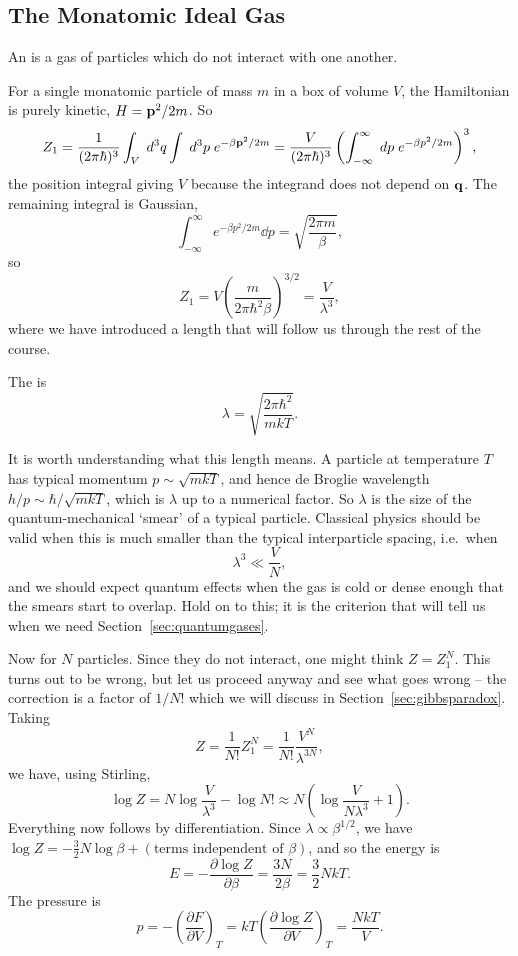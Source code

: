 \documentclass[a4paper]{scrartcl}
\begin{document}
\subsection{The Monatomic Ideal Gas}\label{sec:idealgas}

\begin{definition}
	An  is a gas of particles which do not interact with one another.
\end{definition}

For a single monatomic particle of mass $m$ in a box of volume $V$, the Hamiltonian is purely kinetic, $H = \mathbf{p}^2/2m$. So
$$
Z_1 = \frac{1}{(2\pi\hbar)^3}\int_V \; d^3 q \int \; d^3 p \; e^{-\beta \mathbf{p}^2/2m} = \frac{V}{(2\pi\hbar)^3}\left(\int_{-\infty}^\infty \; d p\; e^{-\beta p^2/2m}\right)^3,
$$
the position integral giving $V$ because the integrand does not depend on $\mathbf{q}$. The remaining integral is Gaussian,
$$
\int_{-\infty}^{\infty} e^{-\beta p^2/2m}\dd p = \sqrt{\frac{2\pi m}{\beta}},
$$
so
$$
Z_1 = V\left(\frac{m}{2\pi\hbar^2\beta}\right)^{3/2} = \frac{V}{\lambda^3},
$$
where we have introduced a length that will follow us through the rest of the course.

\begin{definition}
	The  is
	$$
	\lambda = \sqrt{\frac{2\pi\hbar^2}{mkT}}.
	$$
\end{definition}

It is worth understanding what this length means. A particle at temperature $T$ has typical momentum $p \sim \sqrt{mkT}$, and hence de Broglie wavelength $h/p \sim \hbar/\sqrt{mkT}$, which is $\lambda$ up to a numerical factor. So $\lambda$ is the size of the quantum-mechanical `smear' of a typical particle. Classical physics should be valid when this is much smaller than the typical interparticle spacing, i.e.\ when
$$
\lambda^3 \ll \frac VN,
$$
and we should expect quantum effects when the gas is cold or dense enough that the smears start to overlap. Hold on to this; it is the criterion that will tell us when we need Section~\ref{sec:quantumgases}.

Now for $N$ particles. Since they do not interact, one might think $Z = Z_1^N$. This turns out to be wrong, but let us proceed anyway and see what goes wrong -- the correction is a factor of $1/N!$ which we will discuss in Section~\ref{sec:gibbsparadox}. Taking
$$
Z = \frac{1}{N!}Z_1^N = \frac{1}{N!}\frac{V^N}{\lambda^{3N}},
$$
we have, using Stirling,
$$
\log Z = N \log \frac{V}{\lambda^3} - \log N! \approx N\left(\log \frac{V}{N\lambda^3} + 1\right).
$$
Everything now follows by differentiation. Since $\lambda \propto \beta^{1/2}$, we have $\log Z = -\tfrac 32 N \log\beta + (\text{terms independent of }\beta)$, and so the energy is
$$
E = -\frac{\partial \log Z}{\partial\beta} = \frac{3N}{2\beta} = \frac 32 NkT.
$$
The pressure is
$$
p = -\left(\frac{\partial F}{\partial V}\right)_T = kT \left(\frac{\partial \log Z}{\partial V}\right)_T = \frac{NkT}{V}.
$$
\end{document}
